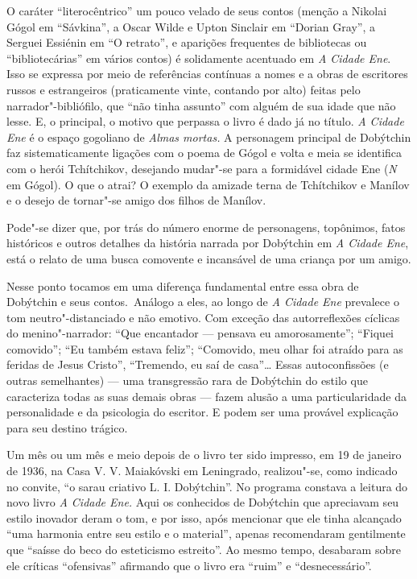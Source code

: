 O caráter ``literocêntrico'' um pouco velado de seus contos
(menção a Nikolai Gógol em ``Sávkina'', a Oscar Wilde e Upton Sinclair
em ``Dorian Gray'', a Serguei Essiénin em ``O retrato'', e aparições
frequentes de bibliotecas ou ``bibliotecárias'' em vários contos) é
solidamente acentuado em \emph{A Cidade Ene}. Isso se expressa por meio
de referências contínuas a nomes e a obras de escritores russos e
estrangeiros (praticamente vinte, contando por alto) feitas pelo
narrador"-bibliófilo, que ``não tinha assunto'' com alguém de sua idade
que não lesse. E, o principal, o motivo que perpassa o livro é dado já
no título. \emph{A Cidade Ene} é o espaço gogoliano de \emph{Almas
mortas.} A personagem principal de Dobýtchin faz sistematicamente
ligações com o poema de Gógol e volta e meia se identifica com o herói
Tchítchikov, desejando mudar"-se para a formidável cidade Ene (\emph{N}
em Gógol). O que o atrai? O exemplo da amizade terna de Tchítchikov e
Manílov e o desejo de tornar"-se amigo dos filhos de Manílov.

Pode"-se dizer que, por trás do número enorme de personagens, topônimos,
fatos históricos e outros detalhes da história narrada por Dobýtchin em
\emph{A Cidade Ene}, está o relato de uma busca comovente e incansável de
uma criança por um amigo.

Nesse ponto tocamos em uma diferença fundamental entre essa obra de
Dobýtchin e seus contos.~Análogo a eles, ao longo de \emph{A Cidade Ene}
prevalece o tom neutro"-distanciado e não emotivo. Com exceção das
autorreflexões cíclicas do menino"-narrador: ``Que encantador --- pensava
eu amorosamente''; ``Fiquei comovido''; ``Eu também estava feliz'';
``Comovido, meu olhar foi atraído para as feridas de Jesus Cristo'',
``Tremendo, eu saí de casa''\ldots{} Essas autoconfissões (e outras
semelhantes) --- uma transgressão rara de Dobýtchin do estilo que
caracteriza todas as suas demais obras --- fazem alusão a uma
particularidade da personalidade e da psicologia do escritor. E podem
ser uma provável explicação para seu destino trágico.

Um mês ou um mês e meio depois de o livro ter sido impresso, em 19 de
janeiro de 1936, na Casa V. V. Maiakóvski em Leningrado, realizou"-se,
como indicado no convite, ``o sarau criativo L. I. Dobýtchin''. No
programa constava a leitura do novo livro \emph{A Cidade Ene.} Aqui os
conhecidos de Dobýtchin que apreciavam seu estilo inovador deram o tom,
e por isso, após mencionar que ele tinha alcançado ``uma harmonia entre
seu estilo e o material'', apenas recomendaram gentilmente que ``saísse
do beco do esteticismo estreito''. Ao mesmo tempo, desabaram sobre ele críticas
``ofensivas'' afirmando que o livro era ``ruim'' e ``desnecessário''.

